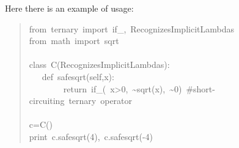 \documentclass[10pt,english]{article}
\begin{document}
Here there is an example of usage:
\begin{quote}
\begin{ttfamily}\begin{flushleft}
\mbox{from~ternary~import~if{\_},~RecognizesImplicitLambdas}\\
\mbox{from~math~import~sqrt}\\
\mbox{}\\
\mbox{class~C(RecognizesImplicitLambdas):}\\
\mbox{~~~def~safesqrt(self,x):}\\
\mbox{~~~~~~~~return~if{\_}(~x>0,~{\textasciitilde}sqrt(x),~{\textasciitilde}0)~{\#}short-circuiting~ternary~operator}\\
\mbox{}\\
\mbox{c=C()}\\
\mbox{print~c.safesqrt(4),~c.safesqrt(-4)~}
\end{flushleft}\end{ttfamily}
\end{quote}
\end{document}
